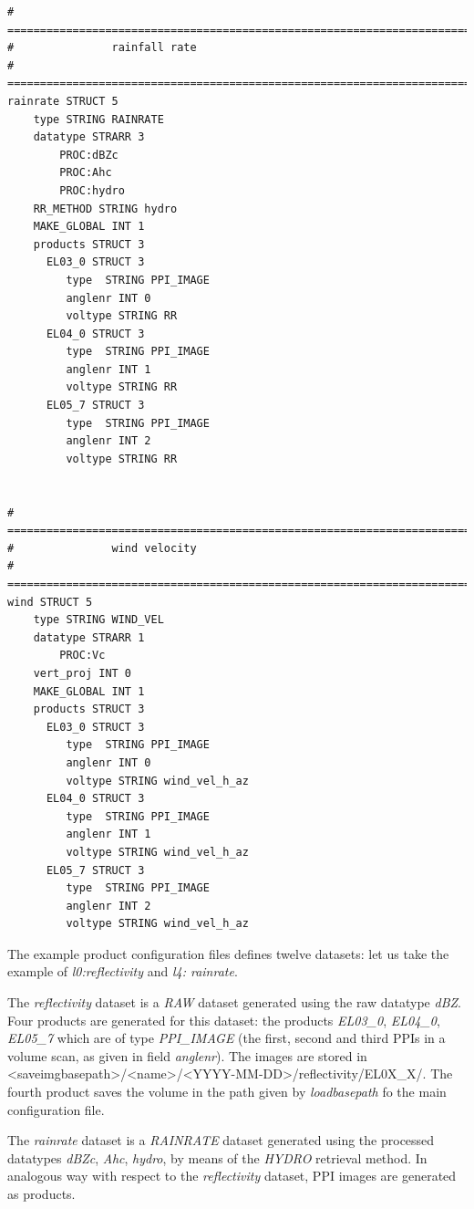 \documentclass[a4paper,11pt,pdftex,twoside]{scrartcl}
\begin{document}
{{{\begin{verbatim}
# ==========================================================================================
#               rainfall rate
# ==========================================================================================            
rainrate STRUCT 5
    type STRING RAINRATE
    datatype STRARR 3
        PROC:dBZc
        PROC:Ahc
        PROC:hydro
    RR_METHOD STRING hydro
    MAKE_GLOBAL INT 1
    products STRUCT 3      
      EL03_0 STRUCT 3
         type  STRING PPI_IMAGE
         anglenr INT 0
         voltype STRING RR
      EL04_0 STRUCT 3
         type  STRING PPI_IMAGE
         anglenr INT 1
         voltype STRING RR
      EL05_7 STRUCT 3
         type  STRING PPI_IMAGE
         anglenr INT 2
         voltype STRING RR

			
# ==========================================================================================
#               wind velocity
# ==========================================================================================
wind STRUCT 5
    type STRING WIND_VEL
    datatype STRARR 1
        PROC:Vc
    vert_proj INT 0
    MAKE_GLOBAL INT 1
    products STRUCT 3      
      EL03_0 STRUCT 3
         type  STRING PPI_IMAGE
         anglenr INT 0
         voltype STRING wind_vel_h_az
      EL04_0 STRUCT 3
         type  STRING PPI_IMAGE
         anglenr INT 1
         voltype STRING wind_vel_h_az
      EL05_7 STRUCT 3
         type  STRING PPI_IMAGE
         anglenr INT 2
         voltype STRING wind_vel_h_az
\end{verbatim}

The example product configuration files defines twelve datasets: let us take the example of \emph{l0:reflectivity}
and \emph{l4: rainrate}.

The \emph{reflectivity} dataset is a \emph{RAW} dataset generated using the raw
datatype \emph{dBZ}. Four products are generated for this dataset: the products
\emph{EL03\_0}, \emph{EL04\_0}, \emph{EL05\_7} which are of type \emph{PPI\_IMAGE} (the first, second and third PPIs in a volume scan, as given in field \emph{anglenr}). The images are stored in
<saveimgbasepath>/<name>/<YYYY-MM-DD>/reflectivity/EL0X\_X/. The fourth product saves the volume in the path given by \emph{loadbasepath} fo the main configuration file. 

The \emph{rainrate} dataset is a \emph{RAINRATE} dataset generated using the processed
datatypes \emph{dBZc}, \emph{Ahc}, \emph{hydro}, by means of the \emph{HYDRO} retrieval method.
In analogous way with respect to the \emph{reflectivity} dataset, PPI images are generated as products.

}}}
\end{document}
